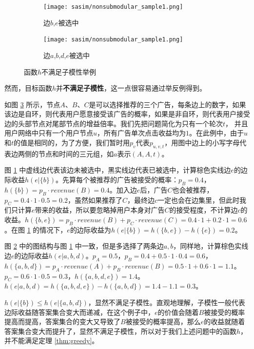 \begin{figure}[htbp]
    \centering
    \begin{subfigure}[t]{0.44\linewidth}
        \centering
        \texttt{[image: sasim/nonsubmodular\_sample1.png]}
        \caption{边$b$,$e$被选中\label{fig:nonsub_a}}
    \end{subfigure}
    \quad
    \begin{subfigure}[t]{0.44\linewidth}
        \centering
        \texttt{[image: sasim/nonsubmodular\_sample1.png]}
        \caption{边$a$,$b$,$d$,$e$被选中\label{fig:nonsub_b}}
    \end{subfigure}

    \caption{\label{fig:nonsub_sample}函数$h$不满足子模性举例}
\end{figure}


然而，目标函数$h$并{\bfseries 不满足子模性}，这一点很容易通过举反例得到。

如图 \ref{fig:nonsub_sample} 所示，节点$A$、$B$、$C$是可以选择推荐的三个广告，每条边上的数字，如果该边是自环，则代表用户愿意接受该广告的概率，如果是非自环，则代表用户接受边的头部节点对尾部节点的增益倍率。我们先把问题简化为只有一个轮次$t$， 并且用户网络中只有一个用户节点$u$，所有广告单次点击收益均为$1$。在此例中，由于$u$和$t$的值是相同的，为了方便，我们暂时用$p_{v}$代表$p_{u,v,t}$，用图中边上的小写字母代表边两侧的节点和时间的三元组，如$a$表示$(A,A,t)$。

图 \ref{fig:nonsub_a} 中虚线边代表该边未被选中，黑实线边代表已被选中，计算棕色实线边$e$的边际收益$h(e|\{b\})$。先算每个被推荐的广告被接受的概率：$p_B=0.4$，$h(\{b\})=p_B \cdot revenue(B)=0.4$。加入边$e$后，广告$C$也会被推荐，$p_C=0.4 \cdot 1 \cdot 0.5=0.2$，虽然如果推荐了$C$，最终边$c$一定也会在边集里，但此时我们只计算$e$带来的收益，所以要忽略掉用户本身对广告$C$的接受程度，不计算边$c$的收益。$h(\{b,e\})=p_B\cdot revenue(B)+p_C\cdot revenue(C)=0.4\cdot 1+0.2\cdot 1=0.6$。在图 \ref{fig:nonsub_a} 的情况下，$e$的边际收益为$h(e|\{b\})=h(\{b,e\})-h(\{e\})=0.2$。

图 \ref{fig:nonsub_b} 中的图结构与图 \ref{fig:nonsub_a} 中一致，但是多选择了两条边$a,b$，同样地，计算棕色实线边$e$的边际收益$h(e|{a,b,d})$。$p_A=0.5$，$p_B=0.4+0.5\cdot 1\cdot 0.4=0.6$，$h(\{a,b,d\})=p_A\cdot revenue(A)+p_B\cdot revenue(B)=0.5\cdot 1 + 0.6 \cdot 1 = 1.1$。$p_C=0.6 \cdot 1\cdot 0.5 = 0.3$，$h(\{a,b,d,e\})=1.4$。$h(e|{a,b,d})=h(\{a,b,d,e\})-h(\{a,b,d\})=1.4-1.1=0.3$。

$h(e|\{b\})\le h(e|\{a,b,d\})$，显然不满足子模性。直观地理解，子模性一般代表边际收益随答案集合变大而递减，在这个例子中，$e$的价值会随着$B$被接受的概率提高而提高，答案集合的变大又导致了$B$被接受的概率提高，那么$e$的收益就随着答案集合变大而提升了，显然不满足子模性，所以对于我们上述问题中的函数$h$，并不能满足定理 \ref{thm:greedy}。

